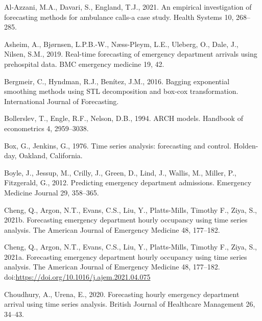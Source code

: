 \documentclass[]{elsarticle} %
\newlength{\cslhangindent}
\newlength{\cslentryspacingunit} %
\newenvironment{CSLReferences}[2] %
 {%
  \setlength{\parindent}{0pt}
  \ifodd #1
  \let\oldpar\par
  \def\par{\hangindent=\cslhangindent\oldpar}
  \fi
  \setlength{\parskip}{#2\cslentryspacingunit}
 }%
 {}
\begin{document}
\hypertarget{refs}{}
\begin{CSLReferences}{1}{0}
\leavevmode{}%
Al-Azzani, M.A., Davari, S., England, T.J., 2021. An empirical investigation of forecasting methods for ambulance calls-a case study. Health Systems 10, 268--285.

\leavevmode{}%
Asheim, A., Bjørnsen, L.P.B.-W., Næss-Pleym, L.E., Uleberg, O., Dale, J., Nilsen, S.M., 2019. Real-time forecasting of emergency department arrivals using prehospital data. BMC emergency medicine 19, 42.

\leavevmode{}%
Bergmeir, C., Hyndman, R.J., Benítez, J.M., 2016. Bagging exponential smoothing methods using STL decomposition and box-cox transformation. International Journal of Forecasting.

\leavevmode{}%
Bollerslev, T., Engle, R.F., Nelson, D.B., 1994. ARCH models. Handbook of econometrics 4, 2959--3038.

\leavevmode{}%
Box, G., Jenkins, G., 1976. {Time series analysis: forecasting and control}. Holden-day, Oakland, California.

\leavevmode{}%
Boyle, J., Jessup, M., Crilly, J., Green, D., Lind, J., Wallis, M., Miller, P., Fitzgerald, G., 2012. Predicting emergency department admissions. Emergency Medicine Journal 29, 358--365.

\leavevmode{}%
Cheng, Q., Argon, N.T., Evans, C.S., Liu, Y., Platts-Mills, Timothy F., Ziya, S., 2021b. Forecasting emergency department hourly occupancy using time series analysis. The American Journal of Emergency Medicine 48, 177--182.

\leavevmode{}%
Cheng, Q., Argon, N.T., Evans, C.S., Liu, Y., Platts-Mills, Timothy F., Ziya, S., 2021a. Forecasting emergency department hourly occupancy using time series analysis. The American Journal of Emergency Medicine 48, 177--182. doi:\url{https://doi.org/10.1016/j.ajem.2021.04.075}

\leavevmode{}%
Choudhury, A., Urena, E., 2020. Forecasting hourly emergency department arrival using time series analysis. British Journal of Healthcare Management 26, 34--43.


\end{CSLReferences}
\end{document}
